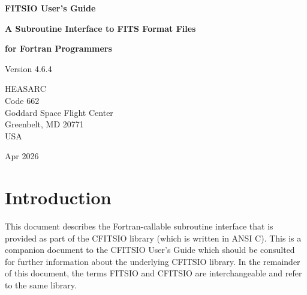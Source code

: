 \documentclass[11pt]{book}
\begin{document}

\begin{titlepage}
\normalsize
\vspace*{4.6cm}
\begin{center}
{\Huge \bf FITSIO User's Guide}\\
\end{center}
\medskip 
\medskip
\begin{center}
{\LARGE \bf A Subroutine Interface to FITS Format Files}\\
\end{center}
\begin{center}
{\LARGE \bf for Fortran Programmers}\\
\end{center}
\medskip
\medskip
\begin{center}
{\Large Version 4.6.4\\}
\end{center}
\bigskip
\vskip 2.5cm
\begin{center}
{HEASARC\\
Code 662\\
Goddard Space Flight Center\\
Greenbelt, MD 20771\\
USA}
\end{center}

\vfill
\bigskip
\begin{center}
{\Large Apr 2026\\}
\end{center}
\vfill
\end{titlepage}

\clearpage

\tableofcontents

\chapter{Introduction }

This document describes the Fortran-callable subroutine interface that
is provided as part of the CFITSIO library (which is written in ANSI
C).  This is a companion document to the CFITSIO User's Guide which
should be consulted for further information about the underlying
CFITSIO library.  In the remainder of this document, the terms FITSIO
and CFITSIO are interchangeable and refer to the same library.
\end{document}
